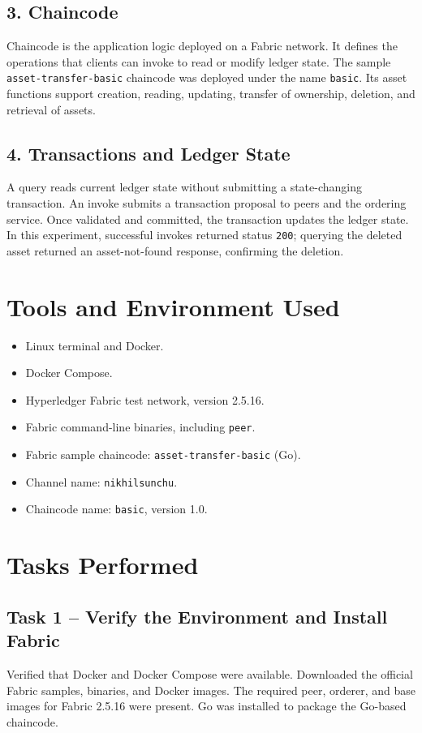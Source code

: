 \documentclass[12pt,a4paper]{article}
\begin{document}
\subsection{3. Chaincode}
Chaincode is the application logic deployed on a Fabric network. It defines the operations that clients can invoke to read or modify ledger state. The sample \texttt{asset-transfer-basic} chaincode was deployed under the name \texttt{basic}. Its asset functions support creation, reading, updating, transfer of ownership, deletion, and retrieval of assets.

\subsection{4. Transactions and Ledger State}
A query reads current ledger state without submitting a state-changing transaction. An invoke submits a transaction proposal to peers and the ordering service. Once validated and committed, the transaction updates the ledger state. In this experiment, successful invokes returned status \texttt{200}; querying the deleted asset returned an asset-not-found response, confirming the deletion.

\section{Tools and Environment Used}
\begin{itemize}[leftmargin=1.5em]
\item Linux terminal and Docker.
\item Docker Compose.
\item Hyperledger Fabric test network, version 2.5.16.
\item Fabric command-line binaries, including \texttt{peer}.
\item Fabric sample chaincode: \texttt{asset-transfer-basic} (Go).
\item Channel name: \texttt{nikhilsunchu}.
\item Chaincode name: \texttt{basic}, version 1.0.
\end{itemize}

\section{Tasks Performed}
\subsection{Task 1 -- Verify the Environment and Install Fabric}
Verified that Docker and Docker Compose were available. Downloaded the official Fabric samples, binaries, and Docker images. The required peer, orderer, and base images for Fabric 2.5.16 were present. Go was installed to package the Go-based chaincode.
\end{document}
